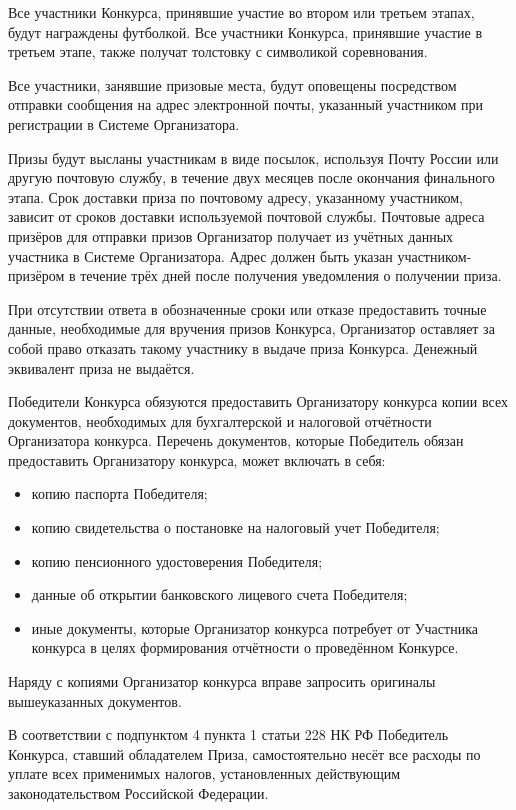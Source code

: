 Все участники Конкурса, принявшие участие во втором или третьем этапах, будут награждены футболкой. Все участники Конкурса, принявшие
участие в третьем этапе, также получат толстовку с символикой соревнования.

Все участники, занявшие призовые места, будут оповещены посредством отправки сообщения на адрес электронной почты, указанный участником при
регистрации в Системе Организатора.

Призы будут высланы участникам в виде посылок, используя Почту России или другую почтовую службу, в течение двух месяцев после окончания
финального этапа. Срок доставки приза по почтовому адресу, указанному участником, зависит от сроков доставки используемой почтовой службы.
Почтовые адреса призёров для отправки призов Организатор получает из учётных данных участника в Системе Организатора. Адрес должен быть
указан участником-призёром в течение трёх дней после получения уведомления о получении приза.

При отсутствии ответа в обозначенные сроки или отказе предоставить точные данные, необходимые для вручения призов Конкурса, Организатор
оставляет за собой право отказать такому участнику в выдаче приза Конкурса. Денежный эквивалент приза не выдаётся.
 
Победители Конкурса обязуются предоставить Организатору конкурса копии всех документов, необходимых для бухгалтерской и налоговой отчётности
Организатора конкурса. Перечень документов, которые Победитель обязан предоставить Организатору конкурса, может включать в себя:
\begin{itemize}
\item копию паспорта Победителя;
\item копию свидетельства о постановке на налоговый учет Победителя;
\item копию пенсионного удостоверения Победителя;
\item данные об открытии банковского лицевого счета Победителя;
\item иные документы, которые Организатор конкурса потребует от Участника конкурса в целях формирования отчётности о проведённом Конкурсе.
\end{itemize}

Наряду с копиями Организатор конкурса вправе запросить оригиналы вышеуказанных документов.

В соответствии с подпунктом 4 пункта 1 статьи 228 НК РФ Победитель Конкурса, ставший обладателем Приза, самостоятельно несёт все расходы по
уплате всех применимых налогов, установленных действующим законодательством Российской Федерации.

